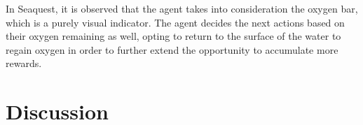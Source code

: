 \documentclass{article}
\begin{document}
In Seaquest, it is observed that the agent takes into consideration the oxygen bar, which is a purely visual indicator. The agent decides the next actions based on their oxygen remaining as well, opting to return to the surface of the water to regain oxygen in order to further extend the opportunity to accumulate more rewards.

\section{Discussion}



\end{document}
